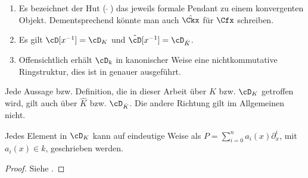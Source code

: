 \begin{bem}
\begin{enumerate}
\item Es bezeichnet der Hut ($ \, \hat \,\, $) das jeweils formale Pendant
zu einem konvergenten Objekt. Dementsprechend könnte man auch $\hat{\Ckx}$ für
$\Cfx$ schreiben.
\item Es gilt $\cD[x^{-1}]=\cD_K$ und $\hat \cD[x^{-1}]=\cD_{\hat K}$.
\item Offensichtlich erhält $\cD_k$ in kanonischer Weise eine nichtkommutative
Ringstruktur, dies ist in \cite[Kapittel 2 Section 1]{ZulaBarbara} genauer
ausgeführt.
\end{enumerate}
\end{bem}
\begin{bem} \label{bem:konvToFormal}
Jede Aussage bzw. Definition, die in dieser Arbeit über $K$ bzw. $\cD_K$
getroffen wird, gilt auch über $\hat K$ bzw. $\cD_{\hat K}$. Die andere
Richtung gilt im Allgemeinen nicht.
\end{bem}

\begin{prop} \label{prop:weyl_eindeutige_schreibung}
Jedes Element in $\cD_K$ kann auf eindeutige
Weise als $P=\sum_{i=0}^na_i(x)\partial_x^i$, mit $a_i(x)\in k$, geschrieben
werden.
\end{prop}
\begin{proof}
Siehe \cite[Proposition 1.2.3]{sabbah_cimpa90}.
\end{proof}
\begin{comment}
Gilt das folgende??
\[
\alpha_i(x)\partial_x^i \equiv \frac{\alpha_i}{x^i}(x\partial_x)^i \mod
F_{i-1}\cD
\]
\end{comment}

